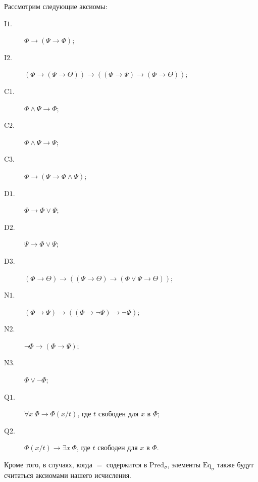 \documentclass[12pt,a4paper]{article}
\newcommand{\Pred}{\ensuremath{\mathrm{Pred}}\xspace}
\newcommand{\Eq}{\ensuremath{\mathrm{Eq}}\xspace}
\begin{document}
    \begin{definition}
        Рассмотрим следующие аксиомы:
        \begin{description}
            \item[$\mathrm{I1}$.] $\Phi \rightarrow (\Psi \rightarrow \Phi)$;
            \item[$\mathrm{I2}$.] $(\Phi \rightarrow (\Psi \rightarrow \Theta)) \rightarrow ((\Phi \rightarrow \Psi) \rightarrow (\Phi \rightarrow \Theta))$;
            \item[$\mathrm{C1}$.] $\Phi \wedge \Psi \rightarrow \Phi$;
            \item[$\mathrm{C2}$.] $\Phi \wedge \Psi \rightarrow \Psi$;
            \item[$\mathrm{C3}$.] $\Phi \rightarrow (\Psi \rightarrow \Phi \wedge \Psi)$;
            \item[$\mathrm{D1}$.] $\Phi \rightarrow \Phi \vee \Psi$;
            \item[$\mathrm{D2}$.] $\Psi \rightarrow \Phi \vee \Psi$;
            \item[$\mathrm{D3}$.] $(\Phi \rightarrow \Theta) \rightarrow ((\Psi \rightarrow \Theta) \rightarrow (\Phi \vee \Psi \rightarrow \Theta))$;
            \item[$\mathrm{N1}$.] $(\Phi \rightarrow \Psi) \rightarrow ((\Phi \rightarrow \neg \Psi) \rightarrow \neg \Phi)$;
            \item[$\mathrm{N2}$.] $\neg \Phi \rightarrow (\Phi \rightarrow \Psi)$;
            \item[$\mathrm{N3}$.] $\Phi \vee \neg \Phi$;
            \item[$\mathrm{Q1}$.] $\forall x\ \Phi \rightarrow \Phi(x/t)$, где $t$ свободен для $x$ в $\Phi$;
            \item[$\mathrm{Q2}$.] $\Phi(x/t) \rightarrow \exists x\ \Phi$, где $t$ свободен для $x$ в $\Phi$.
        \end{description}

        Кроме того, в случаях, когда ${=}$ содержится в $\Pred_\sigma$, элементы $\Eq_\sigma$ также будут считаться аксиомами нашего исчисления.


\end{definition}
\end{document}
